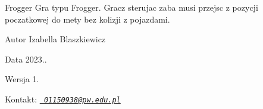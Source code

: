 \begin{DoxyParagraph}{Frogger}
Gra typu Frogger. Gracz sterujac zaba musi przejsc z pozycji poczatkowej do mety bez kolizji z pojazdami. 
\end{DoxyParagraph}
\begin{DoxyAuthor}{Autor}
Izabella Blaszkiewicz 
\end{DoxyAuthor}
\begin{DoxyDate}{Data}
2023.. 
\end{DoxyDate}
\begin{DoxyVersion}{Wersja}
1. 
\end{DoxyVersion}
\begin{DoxyParagraph}{Kontakt\+:}
{\itshape \href{mailto:01150938@pw.edu.pl}{\texttt{ 01150938@pw.\+edu.\+pl}}} 
\end{DoxyParagraph}
